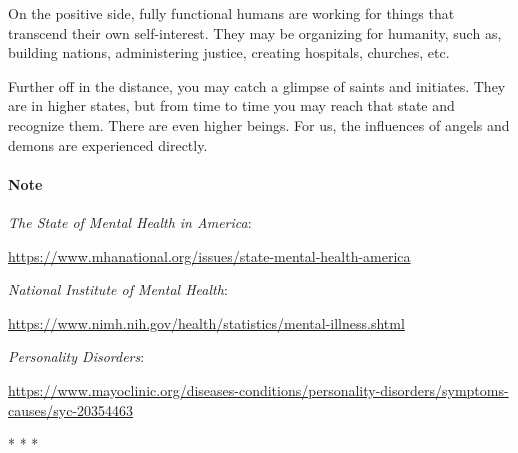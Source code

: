 On the positive side, fully functional humans are working for things that transcend their own self-interest. They may be organizing for humanity, such as, building nations, administering justice, creating hospitals, churches, etc.

Further off in the distance, you may catch a glimpse of saints and initiates. They are in higher states, but from time to time you may reach that state and recognize them. There are even higher beings. For us, the influences of angels and demons are experienced directly.


\hfill

\paragraph{Note}
\textit{The State of Mental Health in America}: 

\url{https://www.mhanational.org/issues/state-mental-health-america}

\textit{National Institute of Mental Health}: 

\url{https://www.nimh.nih.gov/health/statistics/mental-illness.shtml}

\textit{Personality Disorders}: 

\url{https://www.mayoclinic.org/diseases-conditions/personality-disorders/symptoms-causes/syc-20354463}




\begin{center}* * *\end{center}

